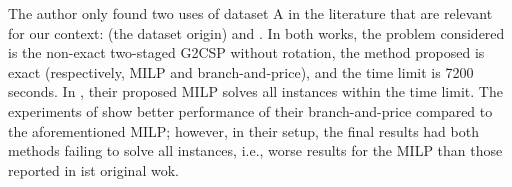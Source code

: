 
The author only found two uses of dataset A in the literature that are relevant for our context: \citet{macedo:2010} (the dataset origin) and \citet{mrad:2013}.
In both works, the problem considered is the non-exact two-staged G2CSP without rotation, the method proposed is exact (respectively, MILP and branch-and-price), and the time limit is 7200 seconds.
In \citet{macedo:2010}, their proposed MILP solves all instances within the time limit.
The experiments of \citet{mrad:2013} show better performance of their branch-and-price compared to the aforementioned MILP; however, in their setup, the final results had both methods failing to solve all instances, i.e., worse results for the MILP than those reported in ist original wok.

